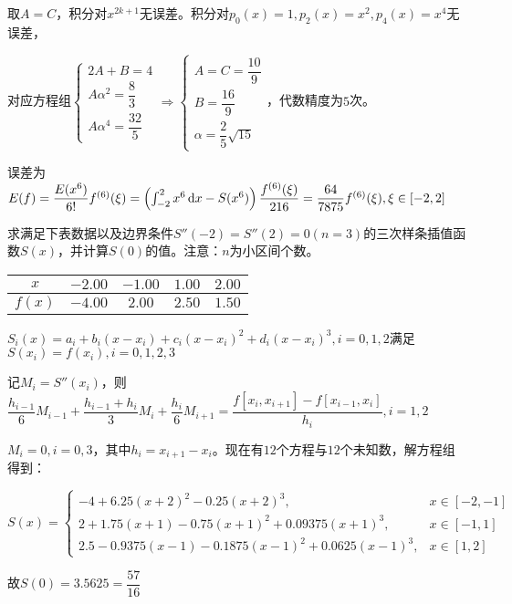    \begin{solution}
        取$A=C$，积分对$x^{2k+1}$无误差。积分对$p_0(x)=1,p_2(x)=x^2,p_4(x)=x^4$无误差，

        对应方程组$\begin{cases}2A+B=4\\A\alpha^2=\dfrac83\\A\alpha^4=\dfrac{32}5\end{cases}\Longrightarrow\begin{cases}A=C=\dfrac{10}9\\B=\dfrac{16}9\\\alpha=\dfrac25\sqrt{15}\end{cases}$，代数精度为$5$次。

        误差为$E(f)=\dfrac{E(x^6)}{6!}f^{(6)}(\xi)=\left(\int_{-2}^2 x^6\mathop{}\!\mathrm{d} x-S(x^6)\right)\dfrac{f^{(6)}(\xi)}{216}=\dfrac{64}{7875} f^{(6)}(\xi),\xi\in[-2,2]$
    \end{solution}

    \begin{homework}[8pts]
        求满足下表数据以及边界条件$S''(-2)=S''(2)=0(n=3)$的三次样条插值函数$S(x)$，并计算$S(0)$的值。注意：$n$为小区间个数。
        \begin{table}[H]
            \begin{center}
                \begin{tabular}{|c|c|c|c|c|}
                \hline
                $x$ & $-2.00$ & $-1.00$ & $1.00$ & $2.00$ \\
                \hline
                $f(x)$ & $-4.00$ & $2.00$ & $2.50$ & $1.50$ \\
                \hline
                \end{tabular}
            \end{center}
        \end{table}
    \end{homework}

    \begin{solution}
        $S_i(x)=a_i+b_i(x-x_i)+c_i(x-x_i)^2+d_i(x-x_i)^3,i=0,1,2$满足$S(x_i)=f(x_i),i=0,1,2,3$

        记$M_i=S''(x_i)$，则$\dfrac{h_{i-1}}{6}M_{i-1}+\dfrac{h_{i-1}+h_i}{3}M_i+\dfrac{h_i}{6}M_{i+1}=\dfrac{f[x_i,x_{i+1}]-f[x_{i-1},x_i]}{h_i},i=1,2$

        $ M_i=0,i=0,3$，其中$h_i=x_{i+1}-x_i$。现在有$12$个方程与$12$个未知数，解方程组得到：

        $ S(x)=\begin{cases}-4+6.25(x+2)^2-0.25(x+2)^3,&x\in[-2,-1]\\2+1.75(x+1)-0.75(x+1)^2+0.09375(x+1)^3,&x\in[-1,1]\\2.5-0.9375(x-1)-0.1875(x-1)^2+0.0625(x-1)^3,&x\in[1,2]\end{cases}$

        故$S(0)=3.5625=\dfrac{57}{16}$

    \end{solution}
